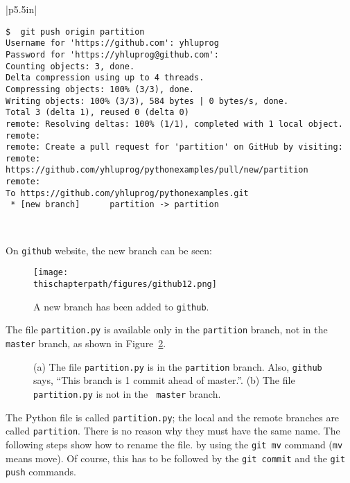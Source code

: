 
\vspace{0.2in}
\noindent
\begin{tabular}{|p{5.5in}|}\hline
\begin{verbatim}
$  git push origin partition
Username for 'https://github.com': yhluprog
Password for 'https://yhluprog@github.com': 
Counting objects: 3, done.
Delta compression using up to 4 threads.
Compressing objects: 100% (3/3), done.
Writing objects: 100% (3/3), 584 bytes | 0 bytes/s, done.
Total 3 (delta 1), reused 0 (delta 0)
remote: Resolving deltas: 100% (1/1), completed with 1 local object.
remote: 
remote: Create a pull request for 'partition' on GitHub by visiting:
remote:      https://github.com/yhluprog/pythonexamples/pull/new/partition
remote: 
To https://github.com/yhluprog/pythonexamples.git
 * [new branch]      partition -> partition
\end{verbatim}
\\ \hline
\end{tabular}
\vspace{0.2in}

\clearpage

On {\tt github} website, the new branch can be seen:

\begin{figure}[h] \centering
{\texttt{[image: \\thischapterpath/figures/github12.png]}}
\caption{A new branch has been added to {\tt github}.}
\label{fig:github12}
\end{figure}

The file {\tt partition.py} is available only in the {\tt partition}
branch, not in the {\tt master} branch, as shown in
Figure~\ref{fig:github134}.

\begin{figure}[h] \centering
\caption{(a) The file {\tt partition.py} is in the {\tt partition}
  branch.  Also, {\tt github} says, ``This branch is 1 commit ahead of
  master.''.  (b) The file {\tt partition.py} is not in the {\tt
    master} branch.}
\label{fig:github134}
\end{figure}

\clearpage

The Python file is called {\tt partition.py}; the local and the remote
branches are called {\tt partition}.  There is no reason why they must
have the same name.  The following steps show how to rename the file.
by using the {\tt git mv} command ({\tt mv} means move). Of course,
this has to be followed by the {\tt git commit} and the {\tt git push}
commands.

